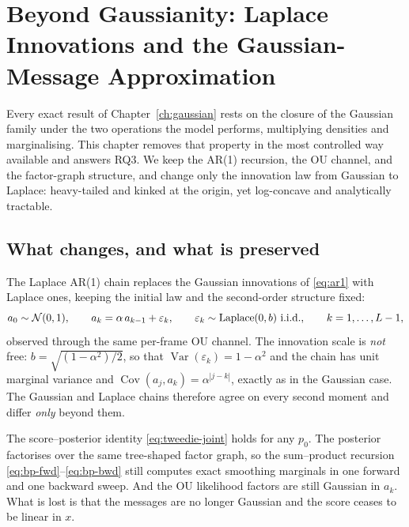 \chapter{Beyond Gaussianity: Laplace Innovations and the Gaussian-Message
Approximation}\label{ch:laplace}\label{sec:bp-nongaussian}

Every exact result of Chapter~\ref{ch:gaussian} rests on the closure of
the Gaussian family under the two operations the model performs,
multiplying densities and marginalising. This chapter removes that
property in the most controlled way available and answers RQ3. We keep
the AR(1) recursion, the OU channel, and the factor-graph structure, and
change only the innovation law from Gaussian to Laplace: heavy-tailed and
kinked at the origin, yet log-concave and analytically tractable.

\section{What changes, and what is preserved}\label{sec:l-model}

The Laplace AR(1) chain replaces the Gaussian innovations of
\eqref{eq:ar1} with Laplace ones, keeping the initial law and the
second-order structure fixed:
\begin{equation}
  a_0 \sim \mathcal{N}(0,1), \qquad
  a_k = \alpha\, a_{k-1} + \varepsilon_k, \qquad
  \varepsilon_k \sim \mathrm{Laplace}(0, b) \ \text{i.i.d.}, \qquad
  k = 1,\dots,L-1 ,
  \label{eq:l-chain-prior}
\end{equation}
observed through the same per-frame OU channel. The innovation scale is
\emph{not} free: $b = \sqrt{(1-\alpha^2)/2}$, so that
$\operatorname{Var}(\varepsilon_k) = 1-\alpha^2$ and the chain has unit
marginal variance and $\operatorname{Cov}(a_j,a_k)=\alpha^{|j-k|}$, exactly
as in the Gaussian case. The Gaussian and Laplace chains therefore agree on
every second moment and differ \emph{only} beyond them.

The score--posterior
identity \eqref{eq:tweedie-joint} holds for any $p_0$. The posterior
factorises over the same tree-shaped factor graph, so the sum--product recursion
\eqref{eq:bp-fwd}--\eqref{eq:bp-bwd} still computes exact smoothing marginals
in one forward and one backward sweep. And the OU likelihood factors are still
Gaussian in $a_k$. What is lost is that the messages are no longer
Gaussian
and the score ceases to be linear in $x$.

